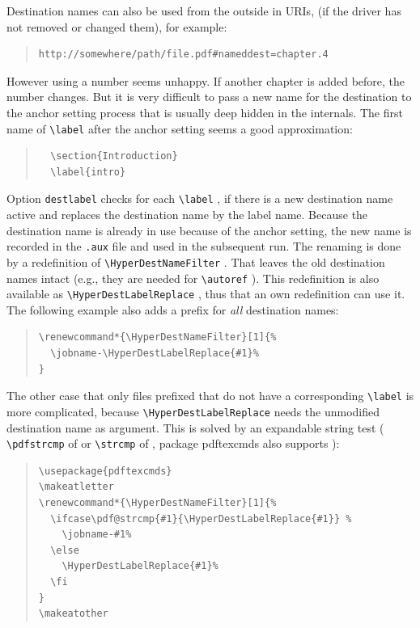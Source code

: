 \documentclass{article}
\newcommand*{\cs}[1]{%
  \texttt{\textbackslash #1}%
}
\newcommand*{\xpackage}[1]{\textsf{#1}}
\begin{document}
Destination names can also be used from the outside in URIs, (if the
driver has not removed or changed them), for example:
\begin{quote}
\begin{verbatim}
http://somewhere/path/file.pdf#nameddest=chapter.4
\end{verbatim}
\end{quote}
However using a number seems unhappy. If another chapter is added
before, the number changes. But it is very difficult to pass
a new name for the destination to the anchor setting process that
is usually deep hidden in the internals. The first name of
\cs{label} after the anchor setting seems a good approximation:
\begin{quote}
\begin{verbatim}
  \section{Introduction}
  \label{intro}
\end{verbatim}
\end{quote}
Option \texttt{destlabel} checks for each \cs{label}, if there is
a new destination name active and replaces the destination
name by the label name. Because the destination name is already in use
because of the anchor setting, the new name is recorded in the \texttt{.aux}
file and used in the subsequent  run. The renaming is done by
a redefinition of \cs{HyperDestNameFilter}. That leaves the old
destination names intact (e.g., they are needed for \cs{autoref}).
This redefinition is also available as \cs{HyperDestLabelReplace},
thus that an own redefinition can use it.
The following example also adds a prefix for \emph{all} destination names:
\begin{quote}
\begin{verbatim}
\renewcommand*{\HyperDestNameFilter}[1]{%
  \jobname-\HyperDestLabelReplace{#1}%
}
\end{verbatim}
\end{quote}
The other case that only files prefixed that do not have a corresponding
\cs{label} is more complicated, because \cs{HyperDestLabelReplace} needs
the unmodified destination name as argument. This is solved by an
expandable string test (\cs{pdfstrcmp} of 
or \cs{strcmp} of , package \xpackage{pdftexcmds} also supports
):
\begin{quote}
\begin{verbatim}
\usepackage{pdftexcmds}
\makeatletter
\renewcommand*{\HyperDestNameFilter}[1]{%
  \ifcase\pdf@strcmp{#1}{\HyperDestLabelReplace{#1}} %
    \jobname-#1%
  \else
    \HyperDestLabelReplace{#1}%
  \fi
}
\makeatother
\end{verbatim}
\end{quote}
\end{document}
